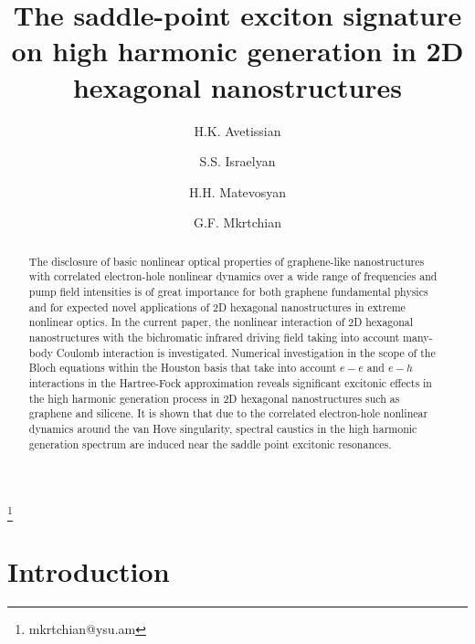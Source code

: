 \documentclass[reprint, superscriptaddress,  aps, pra]{revtex4-2}
\begin{document}
\title{The saddle-point exciton signature on high harmonic generation in 2D
hexagonal nanostructures}

\author{H.K. Avetissian}

\author{S.S. Israelyan}

\author{H.H. Matevosyan}

\author{G.F. Mkrtchian}
\thanks{mkrtchian@ysu.am}


\begin{abstract}
The disclosure of basic nonlinear optical properties of graphene-like
nanostructures with correlated electron-hole nonlinear dynamics over a wide
range of frequencies and pump field intensities is of great importance for
both graphene fundamental physics and for expected novel applications of 2D
hexagonal nanostructures in extreme nonlinear optics. In the current paper,
the nonlinear interaction of 2D hexagonal nanostructures with the
bichromatic infrared driving field taking into account many-body Coulomb
interaction is investigated. Numerical investigation in the scope of the
Bloch equations within the Houston basis that take into account $e-e$ and $%
e-h$ interactions in the Hartree-Fock approximation reveals significant
excitonic effects in the high harmonic generation process in 2D hexagonal
nanostructures such as graphene and silicene. It is shown that due to the
correlated electron-hole nonlinear dynamics around the van Hove singularity,
spectral caustics in the high harmonic generation spectrum are induced near
the saddle point excitonic resonances.
\end{abstract}

\maketitle

\section{ Introduction}
\end{document}
